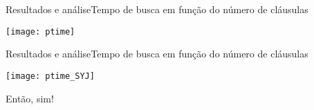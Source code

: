 \begin{frame}{Resultados e análise}{Tempo de busca em função do número de cláusulas}
	\begin{center}
		\texttt{[image: ptime]}
	\end{center}
\end{frame}

\begin{frame}{Resultados e análise}{Tempo de busca em função do número de cláusulas}
	\begin{center}
		\texttt{[image: ptime\_SYJ]}
	\end{center}
	
	\pause Então, sim!
\end{frame}
